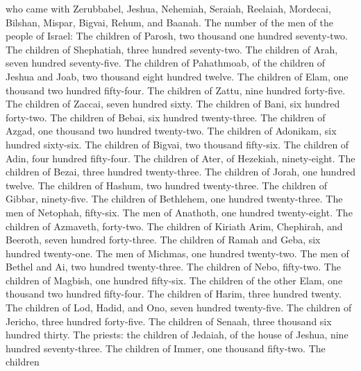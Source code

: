  who came with Zerubbabel, Jeshua, Nehemiah, Seraiah,
Reelaiah, Mordecai, Bilshan, Mispar, Bigvai, Rehum, and Baanah. The
number of the men of the people of Israel:  The children
of Parosh, two thousand one hundred seventy-two.  The
children of Shephatiah, three hundred seventy-two.  The
children of Arah, seven hundred seventy-five.  The
children of Pahathmoab, of the children of Jeshua and Joab, two thousand
eight hundred twelve.  The children of Elam, one thousand
two hundred fifty-four.  The children of Zattu, nine
hundred forty-five.  The children of Zaccai, seven hundred
sixty.  The children of Bani, six hundred forty-two.
 The children of Bebai, six hundred twenty-three.
 The children of Azgad, one thousand two hundred
twenty-two.  The children of Adonikam, six hundred
sixty-six.  The children of Bigvai, two thousand
fifty-six.  The children of Adin, four hundred
fifty-four.  The children of Ater, of Hezekiah,
ninety-eight.  The children of Bezai, three hundred
twenty-three.  The children of Jorah, one hundred twelve.
 The children of Hashum, two hundred twenty-three.
 The children of Gibbar, ninety-five.  The
children of Bethlehem, one hundred twenty-three.  The men
of Netophah, fifty-six.  The men of Anathoth, one hundred
twenty-eight.  The children of Azmaveth, forty-two.
 The children of Kiriath Arim, Chephirah, and Beeroth,
seven hundred forty-three.  The children of Ramah and
Geba, six hundred twenty-one.  The men of Michmas, one
hundred twenty-two.  The men of Bethel and Ai, two
hundred twenty-three.  The children of Nebo, fifty-two.
 The children of Magbish, one hundred fifty-six.
 The children of the other Elam, one thousand two hundred
fifty-four.  The children of Harim, three hundred twenty.
 The children of Lod, Hadid, and Ono, seven hundred
twenty-five.  The children of Jericho, three hundred
forty-five.  The children of Senaah, three thousand six
hundred thirty.  The priests: the children of Jedaiah, of
the house of Jeshua, nine hundred seventy-three.  The
children of Immer, one thousand fifty-two.  The children
